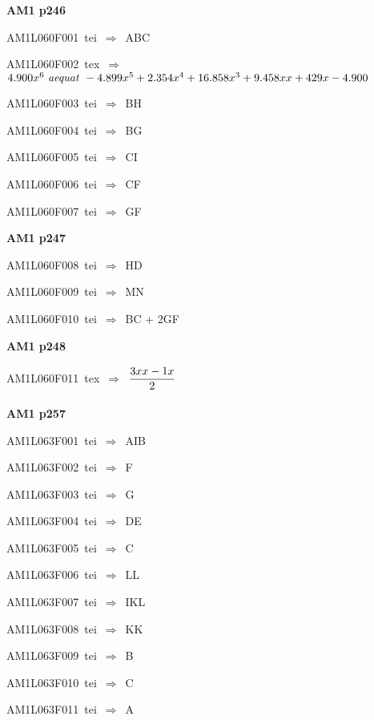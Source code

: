 \par\vfill\eject
{\bf\hfill AM1 p246\hfill\hbox{}}\par\bigskip
{\sixrm AM1L060F001\ {\sixit tei}\ }$\Rightarrow$\ ABC\par\smallskip
{\sixrm AM1L060F002\ {\sixit tex}\ }$\Rightarrow$\ $4.900x^{6} \ {\it aequat}\  - 4.899x^{5} + 2.354x^{4} + 16.858x^{3} + 9.458xx + 429x - 4.900$\par\smallskip
{\sixrm AM1L060F003\ {\sixit tei}\ }$\Rightarrow$\ BH\par\smallskip
{\sixrm AM1L060F004\ {\sixit tei}\ }$\Rightarrow$\ BG\par\smallskip
{\sixrm AM1L060F005\ {\sixit tei}\ }$\Rightarrow$\ CI\par\smallskip
{\sixrm AM1L060F006\ {\sixit tei}\ }$\Rightarrow$\ CF\par\smallskip
{\sixrm AM1L060F007\ {\sixit tei}\ }$\Rightarrow$\ GF\par\smallskip

\par\vfill\eject
{\bf\hfill AM1 p247\hfill\hbox{}}\par\bigskip
{\sixrm AM1L060F008\ {\sixit tei}\ }$\Rightarrow$\ HD\par\smallskip
{\sixrm AM1L060F009\ {\sixit tei}\ }$\Rightarrow$\ MN\par\smallskip
{\sixrm AM1L060F010\ {\sixit tei}\ }$\Rightarrow$\ BC + 2GF\par\smallskip

\par\vfill\eject
{\bf\hfill AM1 p248\hfill\hbox{}}\par\bigskip
{\sixrm AM1L060F011\ {\sixit tex}\ }$\Rightarrow$\ ${\displaystyle\strut {3xx - 1x}\over \displaystyle\strut 2}$\par\smallskip

\par\vfill\eject
{\bf\hfill AM1 p257\hfill\hbox{}}\par\bigskip
{\sixrm AM1L063F001\ {\sixit tei}\ }$\Rightarrow$\ AIB\par\smallskip
{\sixrm AM1L063F002\ {\sixit tei}\ }$\Rightarrow$\ F\par\smallskip
{\sixrm AM1L063F003\ {\sixit tei}\ }$\Rightarrow$\ G\par\smallskip
{\sixrm AM1L063F004\ {\sixit tei}\ }$\Rightarrow$\ DE\par\smallskip
{\sixrm AM1L063F005\ {\sixit tei}\ }$\Rightarrow$\ C\par\smallskip
{\sixrm AM1L063F006\ {\sixit tei}\ }$\Rightarrow$\ LL\par\smallskip
{\sixrm AM1L063F007\ {\sixit tei}\ }$\Rightarrow$\ IKL\par\smallskip
{\sixrm AM1L063F008\ {\sixit tei}\ }$\Rightarrow$\ KK\par\smallskip
{\sixrm AM1L063F009\ {\sixit tei}\ }$\Rightarrow$\ B\par\smallskip
{\sixrm AM1L063F010\ {\sixit tei}\ }$\Rightarrow$\ C\par\smallskip
{\sixrm AM1L063F011\ {\sixit tei}\ }$\Rightarrow$\ A\par\smallskip

